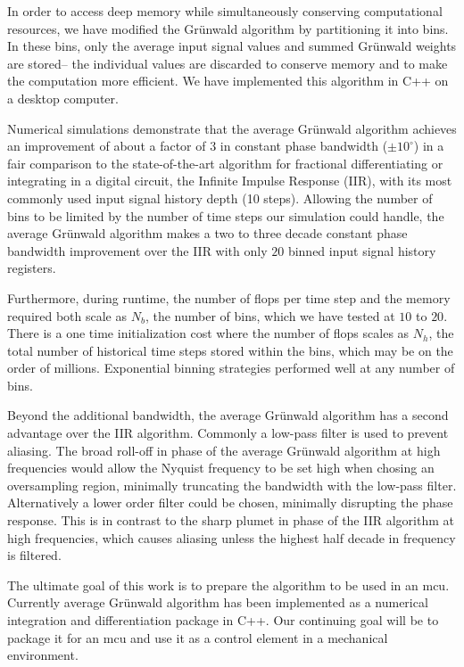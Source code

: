 In order to access deep memory while simultaneously conserving computational resources, we have modified the Gr{\"u}nwald algorithm by partitioning it into bins. In these bins, only the average input signal values and summed Gr{\"u}nwald weights are stored-- the individual values are discarded to conserve memory and to make the computation more efficient. We have implemented this algorithm in C++ on a desktop computer. 

Numerical simulations demonstrate that the average Gr{\"u}nwald algorithm achieves an improvement of about a factor of $3$ in constant phase bandwidth ($\pm 10^\circ$) in a fair comparison to the state-of-the-art algorithm for fractional differentiating or integrating in a digital circuit, the Infinite Impulse Response (IIR), with its most commonly used input signal history depth (10 steps). Allowing the number of bins to be limited by the number of time steps our simulation could handle, the average Gr{\"u}nwald algorithm makes a two to three decade constant phase bandwidth improvement over the IIR with only $20$ binned input signal history registers. 

Furthermore, during runtime, the number of flops per time step and the memory required both scale as $N_b$, the number of bins, which we have tested at $10$ to $20$. There is a one time initialization cost where the number of flops scales as $N_h$, the total number of historical time steps stored within the bins, which may be on the order of millions. Exponential binning strategies performed well at any number of bins. 

Beyond the additional bandwidth, the average Gr{\"u}nwald algorithm has a second advantage over the IIR algorithm. Commonly a low-pass filter is used to prevent aliasing. The broad roll-off  in phase of the average Gr{\"u}nwald algorithm at high frequencies would allow the Nyquist frequency to be set high when chosing an oversampling region, minimally truncating the bandwidth with the low-pass filter. Alternatively a lower order filter could be chosen, minimally disrupting the phase response. This is in contrast to the sharp plumet in phase of the IIR algorithm at high frequencies, which causes aliasing unless the highest half decade in frequency is filtered.

The ultimate goal of this work is to prepare the algorithm to be used in an mcu. Currently average Gr{\"u}nwald algorithm has been implemented as a numerical integration and differentiation package in C++. Our continuing goal will be to package it for an mcu and use it as a control element in a mechanical environment. 

